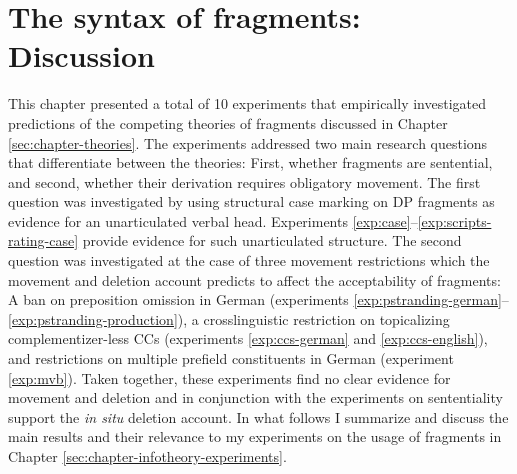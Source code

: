 \section{The syntax of fragments: Discussion}\label{sec:syntax-gdiscussion}
This chapter presented a total of 10 experiments that empirically investigated predictions of the competing theories of fragments discussed in Chapter \ref{sec:chapter-theories}. The experiments addressed two main research questions that differentiate between the theories: First, whether fragments are sentential, and second, whether their derivation requires obligatory movement. The first question was investigated by using structural case marking on DP fragments as evidence for an unarticulated verbal head. Experiments \ref{exp:case}--\ref{exp:scripts-rating-case} provide evidence for such unarticulated structure. The second question was investigated at the case of three movement restrictions which the movement and deletion account predicts to affect the acceptability of fragments: A ban on preposition omission in German (experiments \ref{exp:pstranding-german}--\ref{exp:pstranding-production}), a crosslinguistic restriction on topicalizing complementizer-less CCs (experiments \ref{exp:ccs-german} and \ref{exp:ccs-english}), and restrictions on multiple prefield constituents in German (experiment \ref{exp:mvb}). Taken together, these experiments find no clear evidence for movement and deletion and in conjunction with the experiments on sententiality support the \textit{in situ} deletion account. In what follows I summarize and discuss the main results and their relevance to my experiments on the usage of fragments in Chapter \ref{sec:chapter-infotheory-experiments}.

